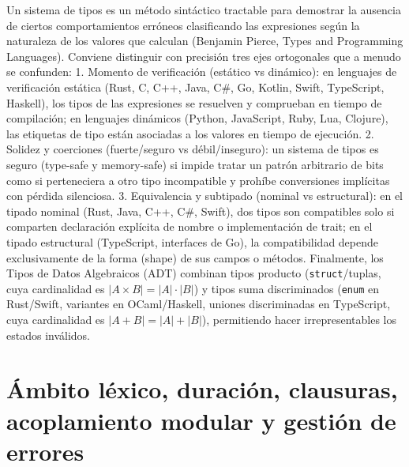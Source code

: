 \documentclass{book}
\begin{document}
Un sistema de tipos es un método sintáctico tractable para demostrar la ausencia de ciertos comportamientos erróneos clasificando las expresiones según la naturaleza de los valores que calculan (Benjamin Pierce, Types and Programming Languages). Conviene distinguir con precisión tres ejes ortogonales que a menudo se confunden:
1. Momento de verificación (estático vs dinámico): en lenguajes de verificación estática (Rust, C, C++, Java, C\#, Go, Kotlin, Swift, TypeScript, Haskell), los tipos de las expresiones se resuelven y comprueban en tiempo de compilación; en lenguajes dinámicos (Python, JavaScript, Ruby, Lua, Clojure), las etiquetas de tipo están asociadas a los valores en tiempo de ejecución.
2. Solidez y coerciones (fuerte/seguro vs débil/inseguro): un sistema de tipos es seguro (type-safe y memory-safe) si impide tratar un patrón arbitrario de bits como si perteneciera a otro tipo incompatible y prohíbe conversiones implícitas con pérdida silenciosa.
3. Equivalencia y subtipado (nominal vs estructural): en el tipado nominal (Rust, Java, C++, C\#, Swift), dos tipos son compatibles solo si comparten declaración explícita de nombre o implementación de trait; en el tipado estructural (TypeScript, interfaces de Go), la compatibilidad depende exclusivamente de la forma (shape) de sus campos o métodos. Finalmente, los Tipos de Datos Algebraicos (ADT) combinan tipos producto (\texttt{struct}/tuplas, cuya cardinalidad es \(|A \times B| = |A| \cdot |B|\)) y tipos suma discriminados (\texttt{enum} en Rust/Swift, variantes en OCaml/Haskell, uniones discriminadas en TypeScript, cuya cardinalidad es \(|A + B| = |A| + |B|\)), permitiendo hacer irrepresentables los estados inválidos.

\section{Ámbito léxico, duración, clausuras, acoplamiento modular y gestión de errores}
\end{document}
